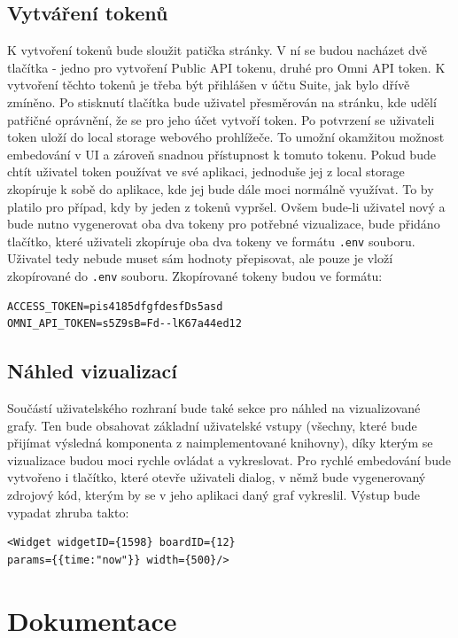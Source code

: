 \documentclass[czech, bc, kiv, he, iso690numb]{fasthesis}
\begin{document}
\subsection{Vytváření tokenů}

K vytvoření tokenů bude sloužit patička stránky. V ní se budou nacházet dvě tlačítka - jedno pro vytvoření Public API tokenu, druhé pro Omni API token. K vytvoření těchto tokenů je třeba být přihlášen v
účtu Suite, jak bylo dřívě zmíněno. Po stisknutí tlačítka bude uživatel přesměrován na stránku, kde udělí patřičné oprávnění, že se pro jeho účet vytvoří token. Po potvrzení se uživateli token uloží
do local storage webového prohlížeče. To umožní okamžitou možnost embedování v UI a zároveň snadnou přístupnost k tomuto tokenu. Pokud bude chtít uživatel token používat ve své aplikaci, jednoduše jej z local storage
zkopíruje k sobě do aplikace, kde jej bude dále moci normálně využívat. To by platilo pro případ, kdy by jeden z tokenů vypršel. Ovšem bude-li uživatel nový a bude nutno vygenerovat oba dva tokeny pro potřebné vizualizace,
bude přidáno tlačítko, které uživateli zkopíruje oba dva tokeny ve formátu \texttt{.env} souboru. Uživatel tedy nebude muset sám hodnoty přepisovat, ale pouze je vloží zkopírované do \texttt{.env} souboru. Zkopírované tokeny
budou ve formátu:
\lstset{style=plainsrc}
\begin{lstlisting}
ACCESS_TOKEN=pis4185dfgfdesfDs5asd
OMNI_API_TOKEN=s5Z9sB=Fd--lK67a44ed12
\end{lstlisting}

\subsection{Náhled vizualizací}
Součástí uživatelského rozhraní bude také sekce pro náhled na vizualizované grafy. Ten bude obsahovat základní uživatelské vstupy (všechny, které bude přijímat výsledná komponenta z naimplementované knihovny), 
díky kterým se vizualizace budou moci rychle ovládat a vykreslovat. Pro rychlé embedování bude vytvořeno i tlačítko, které otevře uživateli dialog, v němž bude vygenerovaný zdrojový kód, kterým by se
v jeho aplikaci daný graf vykreslil. Výstup bude vypadat zhruba takto:

\lstset{style=plainsrc}
\begin{lstlisting}
<Widget widgetID={1598} boardID={12} 
params={{time:"now"}} width={500}/>
\end{lstlisting}


\section{Dokumentace}
\end{document}
